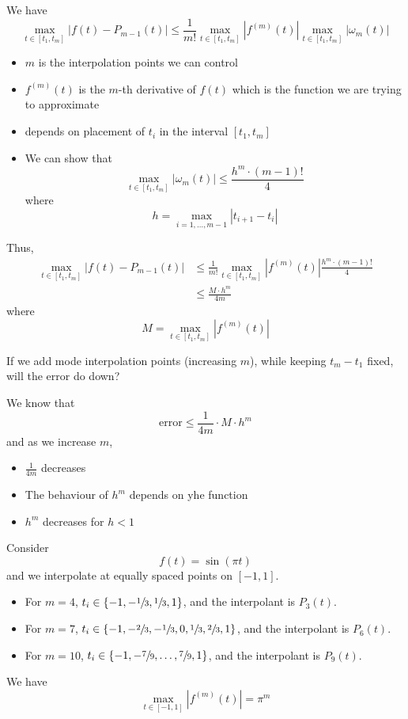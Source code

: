 We have \[
    \max_{t \in [t_1, t_m]} | f(t) - P_{m-1}(t) | \leq \frac{1}{m!} \max_{t \in [t_1, t_m]} | f^{(m)}(t) | \max_{t \in [t_1, t_m]} | \omega_m(t) |
\]
\begin{itemize}
    \item \( m \) is the interpolation points we can control
    \item \( f^{(m)}(t) \) is the \( m \)-th derivative of \( f(t) \) which is the function we are trying to approximate
    \item depends on placement of \( t_i \) in the interval \([t_1, t_m]\)
    \item We can show that \[
              \max_{t \in [t_1, t_m]} | \omega_m(t) | \leq \frac{h^m \cdot (m - 1)!}{4}
          \] where \[
              h = \max_{i = 1, \dots, m-1} | t_{i+1} - t_i |
          \]
\end{itemize}

Thus, \begin{align*}
    \max_{t \in [t_1, t_m]} | f(t) - P_{m-1}(t) |
     & \leq \frac{1}{m!} \max_{t \in [t_1, t_m]} | f^{(m)}(t) | \frac{h^m \cdot (m - 1)!}{4}
    \\
     & \leq \frac{M \cdot h^m}{4m}
\end{align*} where \[
    M = \max_{t \in [t_1, t_m]} | f^{(m)}(t) |
\]

If we add mode interpolation points (increasing \( m \)), while keeping \( t_m - t_1 \) fixed, will the error do down?

We know that \[
    \text{error} \leq \frac{1}{4m} \cdot M \cdot h^m
\] and as we increase \( m \),
\begin{itemize}
    \item \( \frac{1}{4m} \) decreases
    \item The behaviour of \( h^m \) depends on yhe function
    \item \( h^m \) decreases for \( h < 1 \)
\end{itemize}

\begin{example}
    Consider \[
        f(t) = \sin(\pi t)
    \] and we interpolate at equally spaced points on \( [-1, 1] \).

    \begin{itemize}
        \item For \( m = 4 \), \( t_i \in \{ -1, -\sfrac{1}{3}, \sfrac{1}{3}, 1 \} \), and the interpolant is \( P_3(t) \).
        \item For \( m = 7 \), \( t_i \in \{ -1, -\sfrac{2}{3}, -\sfrac{1}{3}, 0, \sfrac{1}{3}, \sfrac{2}{3}, 1 \} \), and the interpolant is \( P_6(t) \).
        \item For \( m = 10 \), \( t_i \in \{ -1, -\sfrac{7}{9}, \dots, \sfrac{7}{9}, 1 \} \), and the interpolant is \( P_9(t) \).
    \end{itemize}


    We have \[
        \max_{t \in [-1, 1]} | f^{(m)}(t) | = \pi^m
    \]
\end{example}

